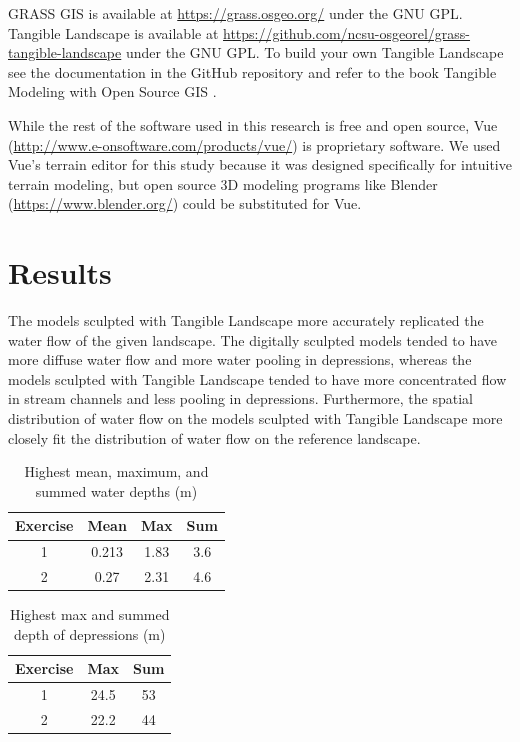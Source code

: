 \documentclass{isprs}
\begin{document}
GRASS GIS is available at
\url{https://grass.osgeo.org/} 
under the GNU GPL. 
%
Tangible Landscape is available at
\url{https://github.com/ncsu-osgeorel/grass-tangible-landscape}
under the GNU GPL. 
%
To build your own Tangible Landscape
see the documentation in the GitHub repository 
and refer to the book Tangible Modeling with Open Source GIS \cite{Petrasova2015}.

While the rest of the software used in this research is free and open source, 
Vue (\url{http://www.e-onsoftware.com/products/vue/}) is proprietary software. 
We used Vue's terrain editor for this study because it was designed specifically for intuitive terrain modeling, but 
open source 3D modeling programs like Blender (\url{https://www.blender.org/}) could be substituted for Vue. 
%

\section{Results}\label{sec:results}
%
The models sculpted with Tangible Landscape more accurately replicated the water flow of the given landscape. 
%
The digitally sculpted models tended to have 
more diffuse water flow
and more water pooling in depressions, whereas 
%
the models sculpted with Tangible Landscape tended to have 
more concentrated flow in stream channels
and less pooling in depressions.
%
Furthermore, 
the spatial distribution of water flow on the models sculpted with Tangible Landscape 
more closely fit the distribution of water flow on the reference landscape. 

\begin{table}[h!]
\caption{Highest mean, maximum, and summed water depths (m)}
\vspace*{0.5em}
\centering
\begin{tabular}{c | c c c}
Exercise & Mean & Max & Sum\\
\hline
1 & 0.213 & 1.83 & 3.6\\
2 & 0.27 & 2.31 & 4.6\\ 
\end{tabular}
\label{table:water_depth} 
\end{table}

\begin{table}[h!]
\caption{Highest max and summed depth of depressions (m)}
\vspace*{0.5em}
\centering
\begin{tabular}{c | c c}
Exercise & Max & Sum \\
\hline
1 & 24.5 & 53\\
2 & 22.2 & 44\\ 
\end{tabular}
\label{table:depressions} 
\end{table}
\end{document}
